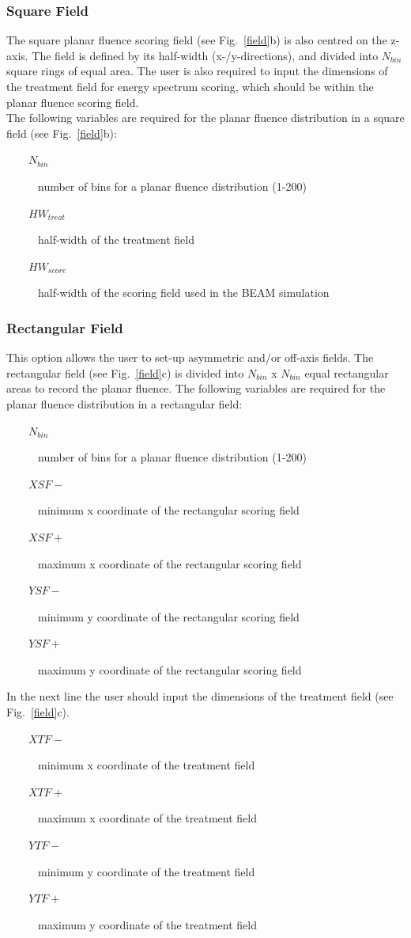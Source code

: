 \documentclass[12pt,twoside]{article}
\begin{document}
\subsubsection{Square Field} The square planar fluence
scoring field (see Fig.~\ref{field}b) is also centred on the z-axis. The
field is defined by its half-width (x-/y-directions), and divided into
$N_{bin}$  square rings of equal area.  The user is also required to input
the dimensions of the treatment field for energy spectrum scoring, which
should be within the planar fluence scoring field.\\

The following variables are required for the planar fluence distribution in a square field (see Fig.~\ref{field}b):
\begin{description}
\item [~~~~$N_{bin}$] number of bins for a planar fluence distribution (1-200)
\item [~~~~$HW_{treat}$] half-width of the treatment field
\item [~~~~$HW_{score}$] half-width of the scoring field used in the BEAM simulation
\end{description}

\subsubsection{Rectangular Field}

This option allows the user to set-up asymmetric and/or off-axis fields. The rectangular field (see Fig.~\ref{field}c) is divided into $N_{bin}$ x $N_{bin}$ equal rectangular areas to record the planar fluence. The following variables are required for the planar fluence distribution in a rectangular field:
\begin{description}
\item [~~~~$N_{bin}$] number of bins for a planar fluence distribution (1-200)
\item [~~~~$XSF-$] minimum x coordinate of the rectangular scoring field
\item [~~~~$XSF+$] maximum x coordinate of the rectangular scoring field
\item [~~~~$YSF-$] minimum y coordinate of the rectangular scoring field
\item [~~~~$YSF+$] maximum y coordinate of the rectangular scoring field
\end{description}
In the next line the user should input the dimensions of the treatment field (see Fig.~\ref{field}c).
\begin{description}
\item [~~~~$XTF-$] minimum x coordinate of the treatment field
\item [~~~~$XTF+$] maximum x coordinate of the treatment field
\item [~~~~$YTF-$] minimum y coordinate of the treatment field
\item [~~~~$YTF+$] maximum y coordinate of the treatment field
\end{description}
\end{document}
